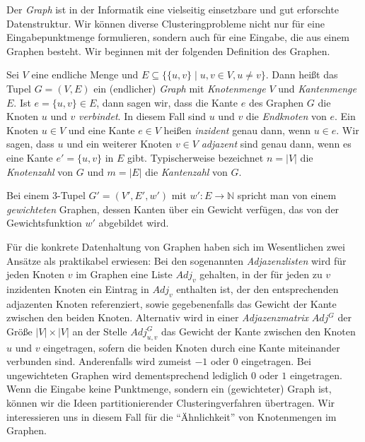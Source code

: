 Der \emph{Graph} ist in der Informatik eine vielseitig einsetzbare und gut erforschte Datenstruktur. Wir können diverse
Clusteringprobleme nicht nur für eine Eingabepunktmenge formulieren, sondern auch für eine Eingabe, die aus einem Graphen
besteht. Wir beginnen mit der folgenden Definition des Graphen.

\begin{definition}[Graph]
\label{def:graph}
	Sei $V$ eine endliche Menge und $E \subseteq \{ \{ u,v \} \mid u, v \in V, u \neq v \}$.
	Dann heißt das Tupel $G = (V, E)$ ein (endlicher) \emph{Graph} mit \emph{Knotenmenge} $V$ und
	\emph{Kantenmenge} $E$. Ist $e = \{ u,v \} \in E$, dann sagen wir, dass die Kante $e$ des Graphen $G$
	die Knoten $u$ und $v$ \emph{verbindet}. In diesem Fall sind $u$ und $v$ die \emph{Endknoten}
	von $e$.
	Ein Knoten $u \in V$ und eine Kante $e \in V$ heißen \emph{inzident}
	genau dann, wenn $u \in e$. Wir sagen, dass $u$ und ein weiterer Knoten $v \in V$ \emph{adjazent}
	sind genau dann, wenn es eine Kante $e' = \{ u,v \}$ in $E$ gibt.
	Typischerweise bezeichnet $n = \left|V\right|$ die \emph{Knotenzahl} von $G$ und
	$m = \left|E\right|$ die \emph{Kantenzahl} von $G$.
	
	Bei einem 3-Tupel $G' = (V', E', w')$ mit $w' : E \rightarrow \mathbb{N}$ spricht man von einem \emph{gewichteten} Graphen,
	dessen Kanten über ein Gewicht verfügen, das von der Gewichtsfunktion $w'$ abgebildet wird.
\end{definition}
Für die konkrete Datenhaltung von Graphen haben sich im Wesentlichen zwei Ansätze als praktikabel erwiesen: Bei den sogenannten
\emph{Adjazenzlisten} wird für jeden Knoten $v$ im Graphen eine Liste $Adj_v$ gehalten, in der für jeden zu $v$ inzidenten
Knoten ein Eintrag in $Adj_v$ enthalten ist, der den entsprechenden adjazenten Knoten referenziert, sowie gegebenenfalls das
Gewicht der Kante zwischen den beiden Knoten.
Alternativ wird in einer
\emph{Adjazenzmatrix} $Adj^G$ der Größe $\left|V\right| \times \left|V\right|$ an der Stelle $Adj^G_{u,v}$ das Gewicht der Kante
zwischen den Knoten $u$ und $v$ eingetragen, sofern die beiden Knoten durch eine Kante miteinander verbunden sind.
Anderenfalls wird zumeist $-1$ oder $0$ eingetragen. Bei ungewichteten Graphen wird dementsprechend lediglich $0$ oder $1$
eingetragen.
\absatz
Wenn die Eingabe keine Punktmenge, sondern ein (gewichteter) Graph ist, können wir die Ideen partitionierender Clusteringverfahren
übertragen. Wir interessieren uns in diesem Fall für die "`Ähnlichkeit"' von Knotenmengen im Graphen.


